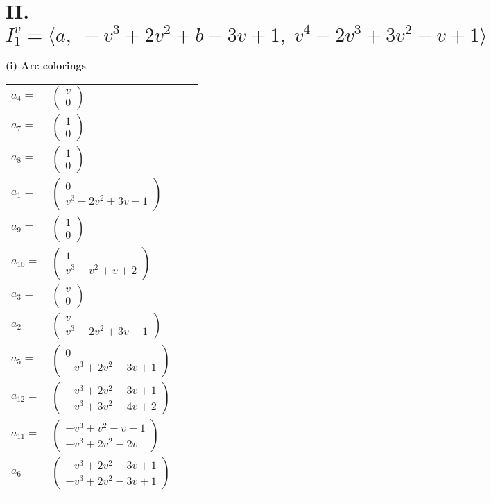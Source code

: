 \documentclass[1p]{elsarticle_modified}
\theoremstyle{definition}
\begin{document}
\centering \section*{II. $I^v_{1}= \langle a,\;- v^3+2 v^2+b-3 v+1,\;v^4-2 v^3+3 v^2- v+1 \rangle$}
\flushleft \textbf{(i) Arc colorings}\\
\begin{tabular}{m{7pt} m{180pt} m{7pt} m{180pt} }
\flushright $a_{4}=$&$\begin{pmatrix}v\\0\end{pmatrix}$ \\
\flushright $a_{7}=$&$\begin{pmatrix}1\\0\end{pmatrix}$ \\
\flushright $a_{8}=$&$\begin{pmatrix}1\\0\end{pmatrix}$ \\
\flushright $a_{1}=$&$\begin{pmatrix}0\\v^3-2 v^2+3 v-1\end{pmatrix}$ \\
\flushright $a_{9}=$&$\begin{pmatrix}1\\0\end{pmatrix}$ \\
\flushright $a_{10}=$&$\begin{pmatrix}1\\v^3- v^2+v+2\end{pmatrix}$ \\
\flushright $a_{3}=$&$\begin{pmatrix}v\\0\end{pmatrix}$ \\
\flushright $a_{2}=$&$\begin{pmatrix}v\\v^3-2 v^2+3 v-1\end{pmatrix}$ \\
\flushright $a_{5}=$&$\begin{pmatrix}0\\- v^3+2 v^2-3 v+1\end{pmatrix}$ \\
\flushright $a_{12}=$&$\begin{pmatrix}- v^3+2 v^2-3 v+1\\- v^3+3 v^2-4 v+2\end{pmatrix}$ \\
\flushright $a_{11}=$&$\begin{pmatrix}- v^3+v^2- v-1\\- v^3+2 v^2-2 v\end{pmatrix}$ \\
\flushright $a_{6}=$&$\begin{pmatrix}- v^3+2 v^2-3 v+1\\- v^3+2 v^2-3 v+1\end{pmatrix}$\\&\end{tabular}
\end{document}

